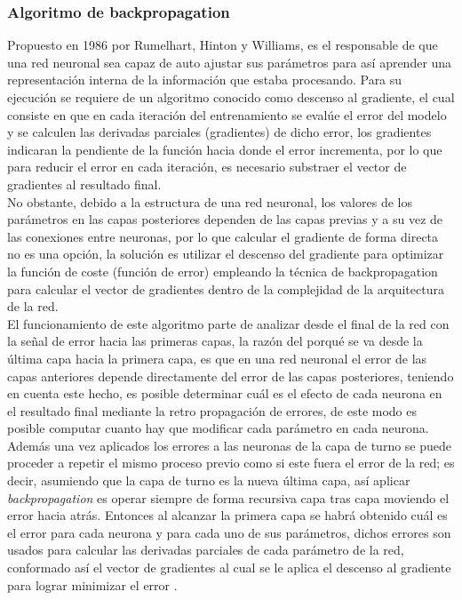 \subsubsection{Algoritmo de backpropagation}
Propuesto en 1986 por Rumelhart, Hinton y Williams, es el responsable de que una red neuronal sea capaz de auto ajustar sus parámetros para así aprender una representación interna de la información que estaba procesando. Para su ejecución se requiere de un algoritmo conocido como descenso al gradiente, el cual consiste en que en cada iteración del entrenamiento se evalúe el error del modelo y se calculen las derivadas parciales (gradientes) de dicho error, los gradientes indicaran la pendiente de la función hacia donde el error incrementa, por lo que para reducir el error en cada iteración, es necesario substraer el vector de gradientes al resultado final. 
\\
No obstante, debido a la estructura de una red neuronal, los valores de los parámetros en las capas posteriores dependen de las capas previas y a su vez de las conexiones entre neuronas, por lo que calcular el gradiente de forma directa no es una opción, la solución es utilizar el descenso del gradiente para optimizar la función de coste (función de error) empleando la técnica de backpropagation para calcular el vector de gradientes dentro de la complejidad de la arquitectura de la red. 
\\
El funcionamiento de este algoritmo parte de analizar desde el final de la red con la señal de error hacia las primeras capas, la razón del porqué se va desde la última capa hacia la primera capa, es que en una red neuronal el error de las capas anteriores depende directamente del error de las capas posteriores, teniendo en cuenta este hecho, es posible determinar cuál es el efecto de cada neurona en el resultado final mediante la retro propagación de errores, de este modo es posible computar cuanto hay que modificar cada parámetro en cada neurona. Además una vez aplicados los errores a las neuronas de la capa de turno se puede proceder a repetir el mismo proceso previo como si este fuera el error de la red; es decir, asumiendo que la capa de turno es la nueva última capa, así aplicar \textit{backpropagation} es operar siempre de forma recursiva capa tras capa moviendo el error hacia atrás. Entonces al alcanzar la primera capa se habrá obtenido cuál es el error para cada neurona y para cada uno de sus parámetros, dichos errores son usados para calcular las derivadas parciales de cada parámetro de la red, conformado así el vector de gradientes al cual se le aplica el descenso al gradiente para lograr minimizar el error \cite[p~284]{Szeliski2022}. 
